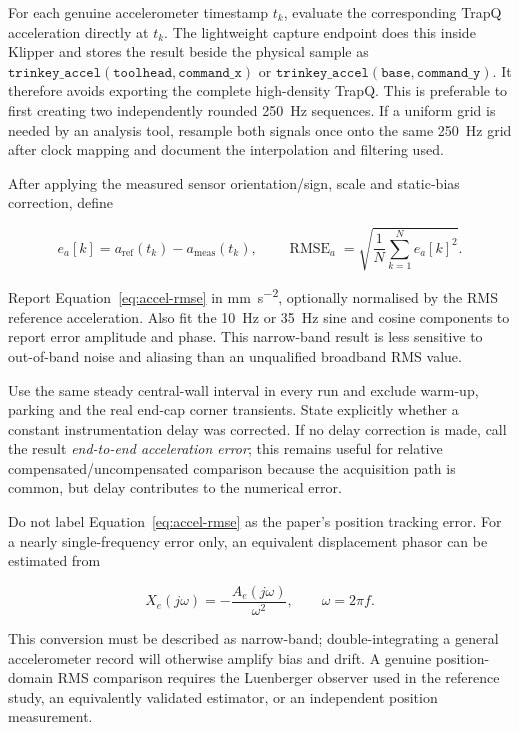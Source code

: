 \documentclass[11pt,a4paper]{article}
\begin{document}
For each genuine accelerometer timestamp \(t_k\), evaluate the corresponding
TrapQ acceleration directly at \(t_k\).  The lightweight capture endpoint does
this inside Klipper and stores the result beside the physical sample as
\(\mathtt{trinkey\_accel(toolhead,command\_x)}\) or
\(\mathtt{trinkey\_accel(base,command\_y)}\).  It therefore avoids exporting
the complete high-density TrapQ.  This is preferable to first creating two
independently rounded \SI{250}{Hz} sequences.  If a uniform grid is needed by
an analysis tool, resample both signals once onto the same \SI{250}{Hz} grid
after clock mapping and document the interpolation and filtering used.

After applying the measured sensor orientation/sign, scale and static-bias
correction, define

\begin{equation}
    e_a[k] = a_{\mathrm{ref}}(t_k)-a_{\mathrm{meas}}(t_k),
    \qquad
    \operatorname{RMSE}_a =
    \sqrt{\frac{1}{N}\sum_{k=1}^{N} e_a[k]^2}.
    \label{eq:accel-rmse}
\end{equation}

Report Equation~\eqref{eq:accel-rmse} in \si{mm.s^{-2}}, optionally normalised
by the RMS reference acceleration.  Also fit the \SI{10}{Hz} or \SI{35}{Hz}
sine and cosine components to report error amplitude and phase.  This
narrow-band result is less sensitive to out-of-band noise and aliasing than an
unqualified broadband RMS value.

Use the same steady central-wall interval in every run and exclude warm-up,
parking and the real end-cap corner transients.  State explicitly whether a
constant instrumentation delay was corrected.  If no delay correction is
made, call the result \emph{end-to-end acceleration error}; this remains useful
for relative compensated/uncompensated comparison because the acquisition path
is common, but delay contributes to the numerical error.

Do not label Equation~\eqref{eq:accel-rmse} as the paper's position tracking
error.  For a nearly single-frequency error only, an equivalent displacement
phasor can be estimated from

\begin{equation}
    X_e(j\omega)=-\frac{A_e(j\omega)}{\omega^2},
    \qquad \omega=2\pi f .
\end{equation}

This conversion must be described as narrow-band; double-integrating a general
accelerometer record will otherwise amplify bias and drift.  A genuine
position-domain RMS comparison requires the Luenberger observer used in the
reference study, an equivalently validated estimator, or an independent
position measurement.
\end{document}
